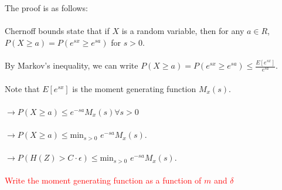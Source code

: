 \documentclass[letterpaper,twocolumn,10pt]{article}
\begin{document}
The proof is as follows:
\\
\\
Chernoff bounds state that if $X$ is a random variable, then for any $a \in R$, $P(X \geq a) = P(e^{sx} \geq e^{sa})$ for $s > 0$. 
\\
\\
By Markov's inequality, we can write $P(X \geq a)  = P(e^{sx} \geq e^{sa}) \leq \frac{E[e^{sx}]}{e^{sa}}$. 
\\
\\
Note that $E[e^{sx}]$ is the moment generating function $M_{x}(s)$. 
\\
\\
$\rightarrow P(X \geq a) \leq e^{-sa} M_{x}(s) \forall s > 0$
\\
\\
$\rightarrow P(X \geq a) \leq $min$_{s >0}$ $e^{-sa} M_{x}(s)$.
\\
\\
$\rightarrow P(H(Z) > C \cdot \epsilon) \leq $min$_{s >0}$ $e^{-sa} M_{x}(s)$.
\\
\\
\textcolor{red}{Write the moment generating function as a function of $m$ and $\delta$}




\end{document}
